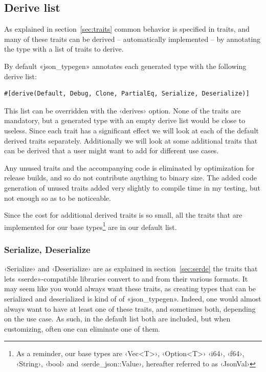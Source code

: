 \subsection{Derive list}

As explained in section~\ref{sec:traits} common behavior is specified in traits, and many of these traits can be derived -- automatically implemented -- by annotating the type with a list of traits to derive.

By default «json_typegen» annotates each generated type with the following derive list:

\begin{verbatim}
#[derive(Default, Debug, Clone, PartialEq, Serialize, Deserialize)]
\end{verbatim}

This list can be overridden with the ‹derives› option. None of the traits are mandatory, but a generated type with an empty derive list would be close to useless. Since each trait has a significant effect we will look at each of the default derived traits separately. Additionally we will look at some additional traits that can be derived that a user might want to add for different use cases.

Any unused traits and the accompanying code is eliminated by optimization for release builds, and so do not contribute anything to binary size. The added code generation of unused traits added very slightly to compile time in my testing, but not enough so as to be noticeable.

Since the cost for additional derived traits is so small, all the traits that are implemented for our base types\footnote{As a reminder, our base types are ‹Vec<T>›, ‹Option<T>› ‹i64›, ‹f64›, ‹String›, ‹bool› and ‹serde_json::Value›, hereafter referred to as ‹JsonVal›} are in our default list.

\subsubsection{Serialize, Deserialize}

‹Serialize› and ‹Deserialize› are as explained in section~\ref{sec:serde} the traits that lets «serde»-compatible libraries convert to and from their various formats. It may seem like you would always want these traits, as creating types that can be serialized and deserialized is kind of  of «json_typegen». Indeed, one would almost always want to have at least one of these traits, and sometimes both, depending on the use case. As such, in the default list both are included, but when customizing, often one can eliminate one of them. %

